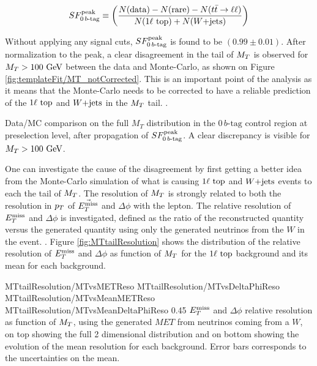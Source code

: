     \begin{equation}
        SF_{0\, b\text{-tag}}^{\text{peak}} \equiv \left( \frac{N(\text{data}) - N(\text{rare}) - N(t\bar{t} \rightarrow \ell \ell)}{N(1\ell~\text{top}) + N(\text{$W$+jets})} \right)
        \label{eq:SF0btagDefinition}
    \end{equation}

    Without applying any signal cuts, $SF_{0\, b\text{-tag}}^{\text{peak}}$ is found to be $(0.99 \pm 0.01)$.
    After normalization to the peak, a clear disagreement in the tail of $M_T$ is observed
    for $M_T > 100 ~\text{GeV}$ between the data and Monte-Carlo, as shown on Figure
    \ref{fig:templateFit/MT_notCorrected}. This is an important point of the analysis as
    it means that the Monte-Carlo needs to be corrected to have a reliable prediction of
    the $1\ell~\text{top}$ and $\text{$W$+jets}$ in the $M_T$ tail. .

                 {Data/MC comparison on the full $M_T$ distribution in the $0\, b\text{-tag}$ control
                 region at preselection level, after propagation of $SF_{0\, b\text{-tag}}^{\text{peak}}$. A clear
                 discrepancy is visible for $M_T > 100 ~\text{GeV}$.}

    One can investigate the cause of the disagreement by first getting a better idea from
    the Monte-Carlo simulation of what is causing $1\ell~\text{top}$ and $\text{$W$+jets}$ events
    to each the tail of $M_T$. The resolution of $M_T$ is strongly related to both the
    resolution in $p_T$ of $\vec{E_T^\text{miss}}$ and $\Delta\phi$ with the lepton. The relative
    resolution of $E_T^\text{miss}$ and $\Delta \phi$ is investigated, defined as the ratio of the
    reconstructed quantity versus the generated quantity using only the generated
    neutrinos from the $W$ in the event. . Figure \ref{fig:MTtailResolution} shows the distribution of the relative
    resolution of $E_T^\text{miss}$ and $\Delta \phi$ as function of $M_T$ for the $1\ell~\text{top}$
    background and its mean for each background.

                      {MTtailResolution/MTvsMETReso}
                      {MTtailResolution/MTvsDeltaPhiReso}
                      {MTtailResolution/MTvsMeanMETReso}
                      {MTtailResolution/MTvsMeanDeltaPhiReso}
                      {0.45}
                      {$E_T^\text{miss}$ and $\Delta \phi$ relative resolution as function of $M_T$,
                      using the generated $MET$ from neutrinos coming from a $W$, on top
                      showing the full 2 dimensional distribution and on bottom showing
                      the evolution of the mean resolution for each background. Error
                      bars corresponds to the uncertainties on the mean.}

